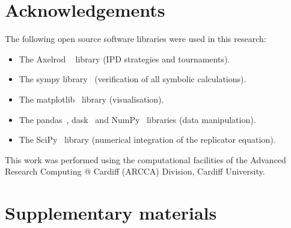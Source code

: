 \documentclass[a4paper]{article}
\begin{document}
\section*{Acknowledgements}

The following open source software libraries were used in this research:

\begin{itemize}
    \item The Axelrod ~\cite{Knight2016, Knight2018} library (IPD strategies and
        tournaments).
    \item The sympy library~\cite{Meurer2017} (verification of all symbolic
        calculations).
    \item The matplotlib~\cite{Droettboom2018} library (visualisation).
    \item The pandas~\cite{Structures2010}, dask~\cite{Dask2016} and
        NumPy~\cite{Oliphant2015} libraries (data manipulation).
    \item The SciPy~\cite{Jones2001} library (numerical integration of the
        replicator equation).
\end{itemize}

This work was performed using the computational facilities of the Advanced
Research Computing @ Cardiff (ARCCA) Division, Cardiff University.

\printbibliography

\newpage
\section*{Supplementary materials}




\end{document}
